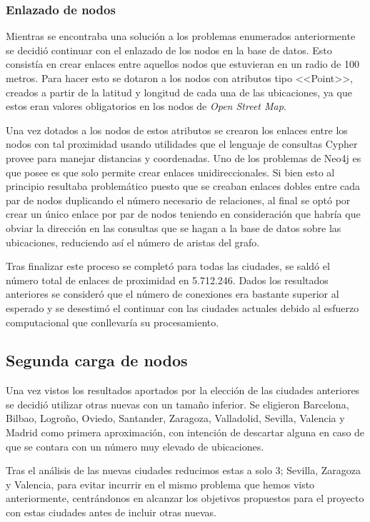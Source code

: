 \subsubsection{Enlazado de nodos}

Mientras se encontraba una solución a los problemas enumerados anteriormente se decidió continuar con el enlazado de los nodos en la base de datos. Esto consistía en crear enlaces entre aquellos nodos que estuvieran en un radio de 100 metros. Para hacer esto se dotaron a los nodos con atributos tipo <<Point>>, creados a partir de la latitud y longitud de cada una de las ubicaciones, ya que estos eran valores obligatorios en los nodos de \textit{Open Street Map}.

 Una vez dotados a los nodos de estos atributos se crearon los enlaces entre los nodos con tal proximidad usando utilidades que el lenguaje de consultas Cypher provee para manejar distancias y coordenadas. Uno de los problemas de Neo4j es que posee es que solo permite crear enlaces unidireccionales. Si bien esto al principio resultaba problemático puesto que se creaban enlaces dobles entre cada par de nodos duplicando el número necesario de relaciones, al final se optó por crear un único enlace por par de nodos teniendo en consideración que habría que obviar la dirección en las consultas que se hagan a la base de datos sobre las ubicaciones, reduciendo así el número de aristas del grafo.
 
  Tras finalizar este proceso se completó para todas las ciudades, se saldó el número total de enlaces de proximidad en 5.712.246. Dados los resultados anteriores se consideró que el número de conexiones era bastante superior al esperado y se desestimó el continuar con las ciudades actuales debido al esfuerzo computacional que conllevaría su procesamiento.


\subsection{Segunda carga de nodos}

Una vez vistos los resultados aportados por la elección de las ciudades anteriores se decidió utilizar otras nuevas con un tamaño inferior. Se eligieron Barcelona, Bilbao, Logroño, Oviedo, Santander, Zaragoza, Valladolid, Sevilla, Valencia y Madrid como primera aproximación, con intención de descartar alguna en caso de que se contara con un número muy elevado de ubicaciones.

Tras el análisis de las nuevas ciudades reducimos estas a solo 3; Sevilla, Zaragoza y Valencia, para evitar incurrir en el mismo problema que hemos visto anteriormente, centrándonos en alcanzar los objetivos propuestos para el proyecto con estas ciudades antes de incluir otras nuevas.


